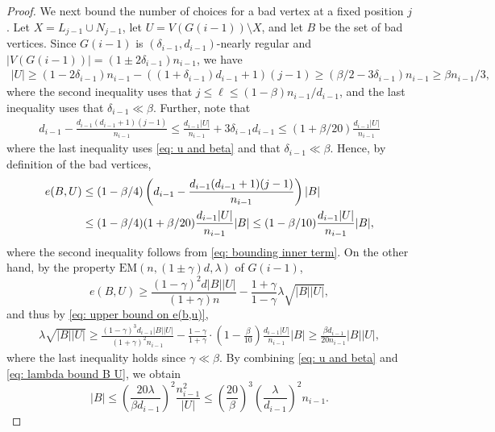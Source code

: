 \documentclass[10pt,a4paper]{amsart}
\newcommand{\EM}{\mathrm{EM}}
\begin{document}
\begin{proof}
We next bound the number of choices for a bad vertex at a fixed position $j$. Let $X=L_{j-1}\cup N_{j-1}$, let $U=V(G(i-1))\setminus X$, and let $B$ be the set of bad vertices. Since $G(i-1)$ is $(\delta_{i-1},d_{i-1})$-nearly regular and $|V(G(i-1))|=(1\pm2\delta_{i-1})n_{i-1}$, we have
\begin{align}
    |U|\ge (1-2\delta_{i-1})n_{i-1}-((1+\delta_{i-1})d_{i-1}+1)(j-1)\ge \left(\beta/2-3\delta_{i-1}\right)n_{i-1}\ge \beta n_{i-1}/3,\label{eq: u and beta}
\end{align}
where the second inequality uses that $j\le\ell\le(1-\beta)n_{i-1}/d_{i-1}$, and the last inequality uses that $\delta_{i-1}\ll \beta$. 
Further, note that
\begin{align}
    d_{i-1}-\frac{d_{i-1}(d_{i-1}+1)(j-1)}{n_{i-1}}\le \frac{d_{i-1}|U|}{n_{i-1}}+3\delta_{i-1}d_{i-1}\le (1+\beta/20)\frac{d_{i-1}|U|}{n_{i-1}}\label{eq: bounding inner term}
\end{align}
where the last inequality uses \eqref{eq: u and beta} and that $\delta_{i-1}\ll \beta$. 
Hence, by definition of the bad vertices,
\begin{align}
    e(B,U)&\le (1-\beta/4)\left(d_{i-1}-\frac{d_{i-1}(d_{i-1}+1)(j-1)}{n_{i-1}}\right)|B|\notag\\
    &\le (1-\beta/4)(1+\beta/20)\frac{d_{i-1}|U|}{n_{i-1}}|B|\le (1-\beta/10)\frac{d_{i-1}|U|}{n_{i-1}}|B|,\label{eq: upper bound on e(b,u)}
\end{align}
where the second inequality follows from \eqref{eq: bounding inner term}.
On the other hand, by the property $\EM(n,(1\pm \gamma)d,\lambda)$ of $G(i-1)$,
\[
e(B,U)\ge \frac{(1-\gamma)^2d|B||U|}{(1+\gamma)n}-\frac{1+\gamma}{1-\gamma}\lambda\sqrt{|B||U|},
\]
and thus by \eqref{eq: upper bound on e(b,u)},
\begin{align}\label{eq: lambda bound B U}
    \lambda\sqrt{|B||U|}\ge \frac{(1-\gamma)^3d_{i-1}|B||U|}{(1+\gamma)^2n_{i-1}}-\frac{1-\gamma}{1+\gamma}\cdot \left(1-\frac{\beta}{10}\right)\frac{d_{i-1}|U|}{n_{i-1}}|B|\ge \frac{\beta d_{i-1}}{20n_{i-1}}|B||U|,
\end{align}
where the last inequality holds since $\gamma\ll \beta$. By combining \eqref{eq: u and beta} and \eqref{eq: lambda bound B U}, we obtain
\begin{equation}\label{eq: bad-choices}
    |B|\le \left(\frac{20\lambda}{\beta d_{i-1}}\right)^2\frac{n_{i-1}^2}{|U|}\le \left(\frac{20}{\beta}\right)^3\left(\frac{\lambda}{d_{i-1}}\right)^2n_{i-1}.
\end{equation}


\end{proof}
\end{document}
